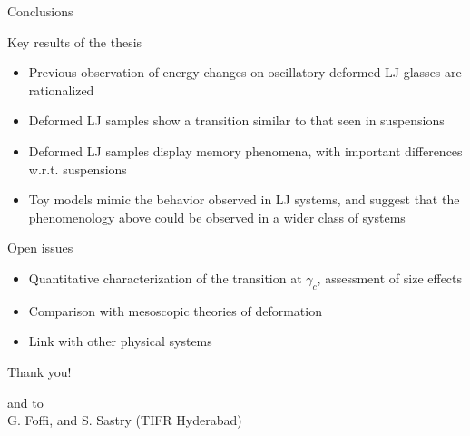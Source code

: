 \documentclass[compress]{beamer}
\begin{document}
%
	\begin{frame}{Conclusions}
		
		\footnotesize
		
		\begin{block}{Key results of the thesis}
			\begin{itemize}
				\item<1-> Previous observation of energy changes on oscillatory deformed LJ glasses are rationalized
				\item<2-> Deformed LJ samples show a transition similar to that seen in suspensions
				\item<3-> Deformed LJ samples display memory phenomena, with important differences w.r.t. suspensions
				\item<4-> Toy models mimic the behavior observed in LJ systems, and suggest that the phenomenology above could be observed in a wider class of systems
			\end{itemize}
		\end{block}
		
		
		\begin{block}{Open issues}
			\begin{itemize}
				\item<6-> Quantitative characterization of the transition at $\gamma_{c}$, assessment of size effects
				\item<7-> Comparison with mesoscopic theories of deformation
				\item<8-> Link with other physical systems
			\end{itemize}
		\end{block}
		
	\end{frame}

	\begin{frame}[noframenumbering]
	
		\centering
		{\Large Thank you!}
		
		\vspace{2cm}
		
		and to \\ G. Foffi, and S. Sastry (TIFR Hyderabad)
		
	\end{frame}
\end{document}
